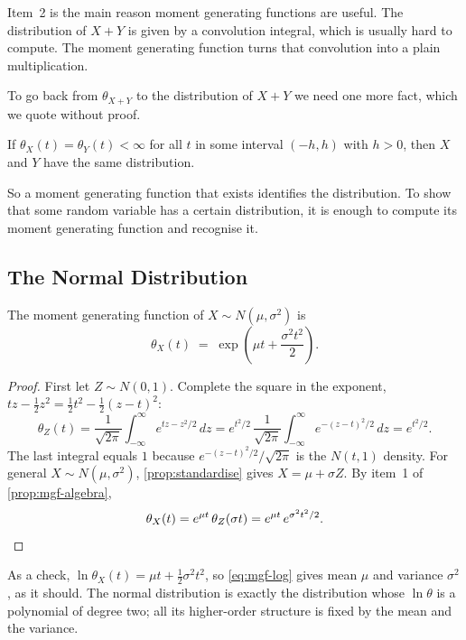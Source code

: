 Item~2 is the main reason moment generating functions are useful.
The distribution of $X+Y$ is given by a convolution integral, which is usually hard to compute.
The moment generating function turns that convolution into a plain multiplication.

To go back from $\theta_{X+Y}$ to the distribution of $X+Y$ we need one more fact, which we quote without proof.

\begin{theorem}[Uniqueness]\label{thm:mgf-unique}
	If $\theta_{X}(t)=\theta_{Y}(t)<\infty$ for all $t$ in some interval $(-h,h)$ with $h>0$, then $X$ and $Y$ have the same distribution.
\end{theorem}

So a moment generating function that exists identifies the distribution.
To show that some random variable has a certain distribution, it is enough to compute its moment generating function and recognise it.
\suppend

\subsection{The Normal Distribution}

\begin{theorem}
	The moment generating function of $X\sim N(\mu,\sigma^{2})$ is
	\begin{equation}
		\theta_{X}(t) \;=\; \exp\left(\mu t + \frac{\sigma^{2}t^{2}}{2}\right) . \label{eq:normal-mgf}
	\end{equation}
\end{theorem}

\suppstart
\begin{proof}
	First let $Z\sim N(0,1)$.
	Complete the square in the exponent, $tz-\tfrac12z^{2}=\tfrac12t^{2}-\tfrac12(z-t)^{2}$:
	\[
		\theta_{Z}(t)
		= \frac{1}{\sqrt{2\pi}}\int_{-\infty}^{\infty} e^{tz-z^{2}/2}\,dz
		= e^{t^{2}/2}\,\frac{1}{\sqrt{2\pi}}\int_{-\infty}^{\infty} e^{-(z-t)^{2}/2}\,dz
		= e^{t^{2}/2} .
	\]
	The last integral equals $1$ because $e^{-(z-t)^{2}/2}/\sqrt{2\pi}$ is the $N(t,1)$ density.
	For general $X\sim N(\mu,\sigma^{2})$, \autoref{prop:standardise} gives $X=\mu+\sigma Z$.
	By item~1 of \autoref{prop:mgf-algebra},
	\[
		\theta_{X}(t)=e^{\mu t}\,\theta_{Z}(\sigma t)=e^{\mu t}\,e^{\sigma^{2}t^{2}/2} .
		\qedhere
	\]
\end{proof}

As a check, $\ln\theta_{X}(t)=\mu t+\tfrac12\sigma^{2}t^{2}$, so \eqref{eq:mgf-log} gives mean $\mu$ and variance $\sigma^{2}$, as it should.
The normal distribution is exactly the distribution whose $\ln\theta$ is a polynomial of degree two; all its higher-order structure is fixed by the mean and the variance.

